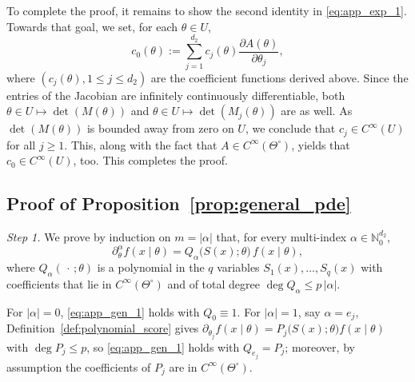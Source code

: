\documentclass[11pt,twoside]{article} %
\begin{document}
To complete the proof, it remains to show the second identity in \eqref{eq:app_exp_1}.
Towards that goal, we set, for each $\theta \in U$,
$$ c_0(\theta) := \sum_{j=1}^{d_2} c_j(\theta)\frac{\partial A(\theta)}{\partial \theta_j}, $$
where $(c_j(\theta), 1 \le j \le d_2)$ are the coefficient functions derived above. 
Since the entries of the Jacobian are infinitely continuously differentiable, both $\theta \in U \mapsto \det(M(\theta))$ and $\theta \in U \mapsto \det(M_j(\theta))$ are as well. As $\det(M(\theta))$ is bounded away from zero on $U$, we conclude  that 
$c_j \in C^\infty(U)$ for all $j \geq 1$. This, along with the fact that $A \in C^\infty(\Theta^\circ)$, yields that $c_0 \in C^\infty(U)$, too. This completes the proof.


\subsection{Proof of Proposition~\ref{prop:general_pde}}
\label{app:proof:prop_general_pde}


\emph{Step 1.}
We prove by induction on $m=|\alpha|$ that, for every multi-index $\alpha\in\mathbb N_0^{d_2}$,
\begin{equation}
    \partial^\alpha_\theta f(x\mid\theta)=Q_\alpha\big(S(x);\theta\big)\,f(x\mid\theta),
    \label{eq:app_gen_1}
\end{equation}
where $Q_\alpha(\,\cdot\,;\theta)$ is a polynomial in the $q$ variables $S_1(x),\dots,S_q(x)$ with
coefficients that
lie in $C^\infty(\Theta^\circ)$ and of total degree $\deg Q_\alpha\le p\,|\alpha|$.

For $|\alpha|=0$, \eqref{eq:app_gen_1} holds with $Q_0\equiv1$. For $|\alpha|=1$, say $\alpha=e_j$,
Definition~\ref{def:polynomial_score} gives $\partial_{\theta_j}f(x\mid\theta)=P_j\big(S(x);\theta\big)f(x\mid\theta)$
with $\deg P_j\le p$, so \eqref{eq:app_gen_1} holds with $Q_{e_j}=P_j$; moreover, by assumption the coefficients
of $P_j$ are in $C^\infty(\Theta^\circ)$.
\end{document}
